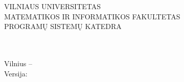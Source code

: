 \begin{titlepage}

  \begin{center}
    \uppercase
    {\normalsize
      Vilniaus universitetas\\
      Matematikos ir informatikos fakultetas\\
      Programų sistemų katedra
    }\\[10.0cm]

    {\Huge\bf
      \docname
    }\\[0.5cm]
    
    {\Large
      \doctype
    }\\[4.0cm]

    \begin{minipage}[]{0.8\textwidth}
      \begin{flushright}
        \authors{}
      \end{flushright}
    \end{minipage}
    
  \end{center}
  
  \begin{center}
    \vfill
    Vilnius – \the\year \\
    Versija: \docversion
  \end{center}

\end{titlepage}
